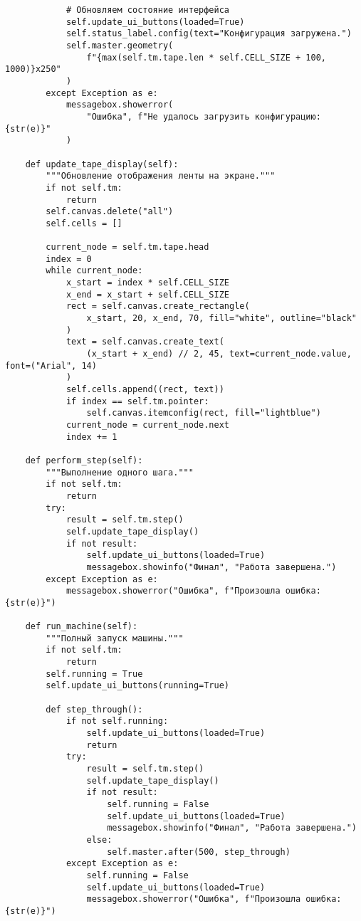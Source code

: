 \begin{lstlisting}
            # Обновляем состояние интерфейса
            self.update_ui_buttons(loaded=True)
            self.status_label.config(text="Конфигурация загружена.")
            self.master.geometry(
                f"{max(self.tm.tape.len * self.CELL_SIZE + 100, 1000)}x250"
            )
        except Exception as e:
            messagebox.showerror(
                "Ошибка", f"Не удалось загрузить конфигурацию: {str(e)}"
            )

    def update_tape_display(self):
        """Обновление отображения ленты на экране."""
        if not self.tm:
            return
        self.canvas.delete("all")
        self.cells = []

        current_node = self.tm.tape.head
        index = 0
        while current_node:
            x_start = index * self.CELL_SIZE
            x_end = x_start + self.CELL_SIZE
            rect = self.canvas.create_rectangle(
                x_start, 20, x_end, 70, fill="white", outline="black"
            )
            text = self.canvas.create_text(
                (x_start + x_end) // 2, 45, text=current_node.value, font=("Arial", 14)
            )
            self.cells.append((rect, text))
            if index == self.tm.pointer:
                self.canvas.itemconfig(rect, fill="lightblue")
            current_node = current_node.next
            index += 1

    def perform_step(self):
        """Выполнение одного шага."""
        if not self.tm:
            return
        try:
            result = self.tm.step()
            self.update_tape_display()
            if not result:
                self.update_ui_buttons(loaded=True)
                messagebox.showinfo("Финал", "Работа завершена.")
        except Exception as e:
            messagebox.showerror("Ошибка", f"Произошла ошибка: {str(e)}")

    def run_machine(self):
        """Полный запуск машины."""
        if not self.tm:
            return
        self.running = True
        self.update_ui_buttons(running=True)

        def step_through():
            if not self.running:
                self.update_ui_buttons(loaded=True)
                return
            try:
                result = self.tm.step()
                self.update_tape_display()
                if not result:
                    self.running = False
                    self.update_ui_buttons(loaded=True)
                    messagebox.showinfo("Финал", "Работа завершена.")
                else:
                    self.master.after(500, step_through)
            except Exception as e:
                self.running = False
                self.update_ui_buttons(loaded=True)
                messagebox.showerror("Ошибка", f"Произошла ошибка: {str(e)}")


\end{lstlisting}
